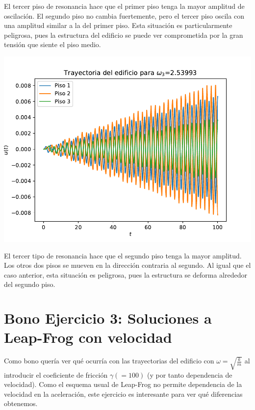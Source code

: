 \documentclass[11pt,letterpaper]{exam}
\begin{document}
El tercer piso de resonancia hace que el primer piso tenga la mayor amplitud de oscilación. El segundo piso no cambia fuertemente, pero el tercer piso oscila con una amplitud similar a la del primer piso. Esta situación es particularmente peligrosa, pues la estructura del edificio se puede ver comprometida por la gran tensión que siente el piso medio.
\begin{center}
\includegraphics[width=14cm]{3_Edificio_omega3.pdf}
\end{center}
El tercer tipo de resonancia hace que el segundo piso tenga la mayor amplitud. Los otros dos pisos se mueven en la dirección contraria al segundo. Al igual que el caso anterior, esta situación es peligrosa, pues la estructura se deforma alrededor del segundo piso.

\section{Bono Ejercicio 3: Soluciones a Leap-Frog con velocidad}
Como bono quería ver qué ocurría con las trayectorias del edificio con $\omega = \sqrt{\frac{k}{m}}$ al introducir el coeficiente de fricción $\gamma(=100)$ (y por tanto dependencia de velocidad). Como el esquema usual de Leap-Frog no permite dependencia de la velocidad en la aceleración, este ejercicio es interesante para ver qué diferencias obtenemos.
\end{document}
